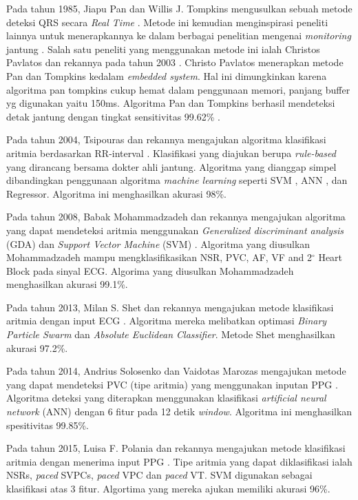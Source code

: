 Pada tahun 1985, Jiapu Pan dan Willis J. Tompkins mengusulkan sebuah metode deteksi QRS secara \textit{Real Time} \cite{pantom}. Metode ini kemudian menginspirasi peneliti lainnya untuk menerapkannya ke dalam berbagai penelitian mengenai \textit{monitoring} jantung \cite{pantom_hardware, pantom_hardware2}. Salah satu peneliti yang menggunakan metode ini ialah Christos Pavlatos dan rekannya pada tahun 2003 \cite{pantom_hardware}. Christo Pavlatos menerapkan metode Pan dan Tompkins kedalam \textit{embedded system}. Hal ini dimungkinkan karena algoritma pan tompkins cukup hemat dalam penggunaan memori, panjang buffer yg digunakan yaitu 150ms. Algoritma Pan dan Tompkins berhasil mendeteksi detak jantung dengan tingkat sensitivitas 99.62\% \cite{pantom}.

Pada tahun 2004, Tsipouras dan rekannya mengajukan algoritma klasifikasi aritmia berdasarkan RR-interval \cite{rr_classification}. Klasifikasi yang diajukan berupa \textit{rule-based} yang dirancang bersama dokter ahli jantung. Algoritma yang dianggap simpel dibandingkan penggunaan algoritma \textit{machine learning} seperti SVM \cite{aritmia_svm}, ANN \cite{aritmia_ann}, dan Regressor. Algoritma ini menghasilkan akurasi 98\%.

Pada tahun 2008, Babak Mohammadzadeh dan rekannya mengajukan algoritma yang dapat mendeteksi aritmia menggunakan \textit{Generalized discriminant analysis} (GDA) dan \textit{Support Vector Machine} (SVM) \cite{aritmia_svm}. Algoritma yang diusulkan Mohammadzadeh mampu mengklasifikasikan NSR, PVC, AF, VF and 2$^{\circ}$ Heart Block pada sinyal ECG. Algorima yang diusulkan Mohammadzadeh menghasilkan akurasi 99.1\%.

Pada tahun 2013, Milan S. Shet dan rekannya mengajukan metode klasifikasi aritmia dengan input ECG \cite{aritmia_swarm}. Algoritma mereka melibatkan optimasi \textit{Binary Particle Swarm} dan \textit{Absolute Euclidean Classifier}. Metode Shet menghasilkan akurasi 97.2\%.

Pada tahun 2014, Andrius Solosenko dan Vaidotas Marozas mengajukan metode yang dapat mendeteksi PVC (tipe aritmia) yang menggunakan inputan PPG \cite{aritmia_ann}. Algoritma deteksi yang diterapkan menggunakan klasifikasi \textit{artificial neural network} (ANN) dengan 6 fitur pada 12 detik \textit{window}. Algoritma ini menghasilkan spesitivitas 99.85\%.

Pada tahun 2015, Luisa F. Polania dan rekannya mengajukan metode klasifikasi aritmia dengan menerima input PPG \cite{aritmia_svm_ppg}. Tipe aritmia yang dapat diklasifikasi ialah NSRs, \textit{paced} SVPCs, \textit{paced} VPC dan \textit{paced} VT. SVM digunakan sebagai klasifikasi atas 3 fitur. Algortima yang mereka ajukan memiliki akurasi 96\%.

